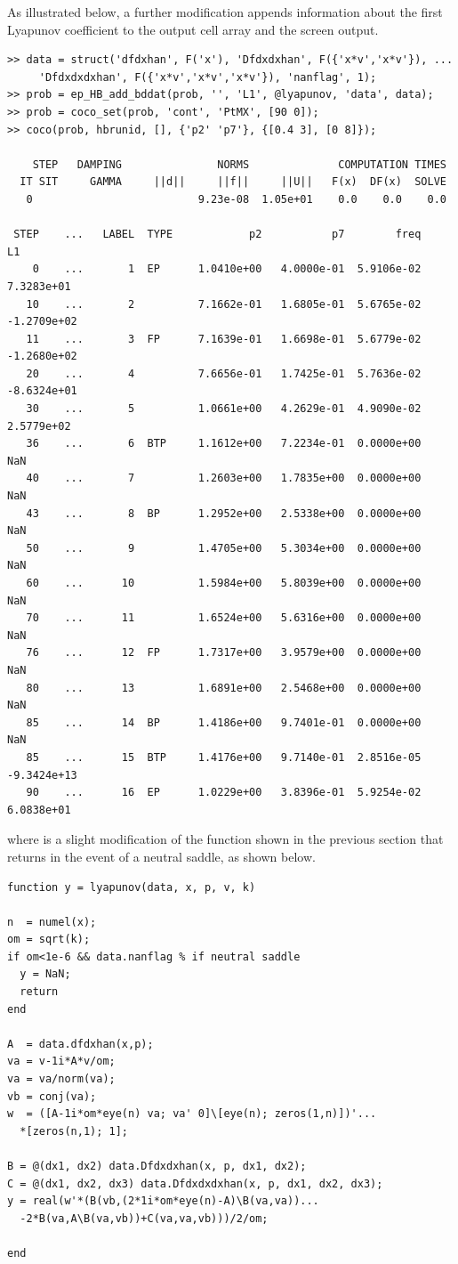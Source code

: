As illustrated below, a further modification appends information about the first Lyapunov coefficient to the output cell array and the screen output.
\begin{lstlisting}[language=coco-highlight,frame=lines]
>> data = struct('dfdxhan', F('x'), 'Dfdxdxhan', F({'x*v','x*v'}), ...
     'Dfdxdxdxhan', F({'x*v','x*v','x*v'}), 'nanflag', 1);
>> prob = ep_HB_add_bddat(prob, '', 'L1', @lyapunov, 'data', data);
>> prob = coco_set(prob, 'cont', 'PtMX', [90 0]);
>> coco(prob, hbrunid, [], {'p2' 'p7'}, {[0.4 3], [0 8]});

    STEP   DAMPING               NORMS              COMPUTATION TIMES
  IT SIT     GAMMA     ||d||     ||f||     ||U||   F(x)  DF(x)  SOLVE
   0                          9.23e-08  1.05e+01    0.0    0.0    0.0

 STEP    ...   LABEL  TYPE            p2           p7        freq          L1
    0    ...       1  EP      1.0410e+00   4.0000e-01  5.9106e-02  7.3283e+01
   10    ...       2          7.1662e-01   1.6805e-01  5.6765e-02 -1.2709e+02
   11    ...       3  FP      7.1639e-01   1.6698e-01  5.6779e-02 -1.2680e+02
   20    ...       4          7.6656e-01   1.7425e-01  5.7636e-02 -8.6324e+01
   30    ...       5          1.0661e+00   4.2629e-01  4.9090e-02  2.5779e+02
   36    ...       6  BTP     1.1612e+00   7.2234e-01  0.0000e+00         NaN
   40    ...       7          1.2603e+00   1.7835e+00  0.0000e+00         NaN
   43    ...       8  BP      1.2952e+00   2.5338e+00  0.0000e+00         NaN
   50    ...       9          1.4705e+00   5.3034e+00  0.0000e+00         NaN
   60    ...      10          1.5984e+00   5.8039e+00  0.0000e+00         NaN
   70    ...      11          1.6524e+00   5.6316e+00  0.0000e+00         NaN
   76    ...      12  FP      1.7317e+00   3.9579e+00  0.0000e+00         NaN
   80    ...      13          1.6891e+00   2.5468e+00  0.0000e+00         NaN
   85    ...      14  BP      1.4186e+00   9.7401e-01  0.0000e+00         NaN
   85    ...      15  BTP     1.4176e+00   9.7140e-01  2.8516e-05 -9.3424e+13
   90    ...      16  EP      1.0229e+00   3.8396e-01  5.9254e-02  6.0838e+01
\end{lstlisting}
where  is a slight modification of the function shown in the previous section that returns  in the event of a neutral saddle, as shown below.
\begin{lstlisting}[language=coco-highlight,frame=shadowbox]
function y = lyapunov(data, x, p, v, k)

n  = numel(x);
om = sqrt(k);
if om<1e-6 && data.nanflag % if neutral saddle
  y = NaN;
  return
end

A  = data.dfdxhan(x,p);
va = v-1i*A*v/om;
va = va/norm(va);
vb = conj(va);
w  = ([A-1i*om*eye(n) va; va' 0]\[eye(n); zeros(1,n)])'...
  *[zeros(n,1); 1];

B = @(dx1, dx2) data.Dfdxdxhan(x, p, dx1, dx2);
C = @(dx1, dx2, dx3) data.Dfdxdxdxhan(x, p, dx1, dx2, dx3); 
y = real(w'*(B(vb,(2*1i*om*eye(n)-A)\B(va,va))...
  -2*B(va,A\B(va,vb))+C(va,va,vb)))/2/om;

end
\end{lstlisting}
